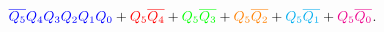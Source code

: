 \begin{figure}[H]
  \begin{subfigure}{0.5\textwidth}
    \centering
  \end{subfigure}
  \begin{subfigure}{.4\textwidth}
    \centering
  \end{subfigure}
  \caption*{$
  \color{blue} \overline{Q_5} Q_4 Q_3 Q_2 Q_1 Q_0
  \color{black} +
  \color{red} Q_5 \overline{Q_4}
  \color{black} +
  \color{green} Q_5 \overline{Q_3}
  \color{black} +
  \color{orange} Q_5 \overline{Q_2}
  \color{black} +
  \color{cyan} Q_5 \overline{Q_1}
  \color{black} +
  \color{magenta} Q_5 \overline{Q_0}
  $.}
\end{figure}
